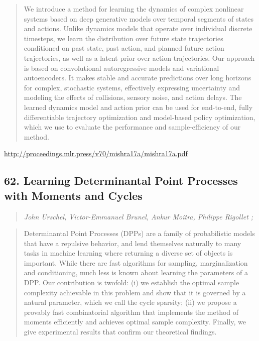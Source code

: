 \documentclass{article}
\begin{document}
\begin{quote}
    We introduce a method for learning the dynamics of complex nonlinear systems based on deep generative models over temporal segments of states and actions. Unlike dynamics models that operate over individual discrete timesteps, we learn the distribution over future state trajectories conditioned on past state, past action, and planned future action trajectories, as well as a latent prior over action trajectories. Our approach is based on convolutional autoregressive models and variational autoencoders. It makes stable and accurate predictions over long horizons for complex, stochastic systems, effectively expressing uncertainty and modeling the effects of collisions, sensory noise, and action delays. The learned dynamics model and action prior can be used for end-to-end, fully differentiable trajectory optimization and model-based policy optimization, which we use to evaluate the performance and sample-efficiency of our method.  
\end{quote}

\href{http://proceedings.mlr.press/v70/mishra17a/mishra17a.pdf}{http://proceedings.mlr.press/v70/mishra17a/mishra17a.pdf}

\subsection{62. Learning Determinantal Point Processes with Moments and Cycles}

\begin{quote}
\footnotesize{\textit{John Urschel, Victor-Emmanuel Brunel, Ankur Moitra, Philippe Rigollet ;}}

\end{quote}

\begin{quote}
    Determinantal Point Processes (DPPs) are a family of probabilistic models that have a repulsive behavior, and lend themselves naturally to many tasks in machine learning where returning a diverse set of objects is important. While there are fast algorithms for sampling, marginalization and conditioning, much less is known about learning the parameters of a DPP. Our contribution is twofold: (i) we establish the optimal sample complexity achievable in this problem and show that it is governed by a natural parameter, which we call the cycle sparsity; (ii) we propose a provably fast combinatorial algorithm that implements the method of moments efficiently and achieves optimal sample complexity. Finally, we give experimental results that confirm our theoretical findings.  
\end{quote}
\end{document}
